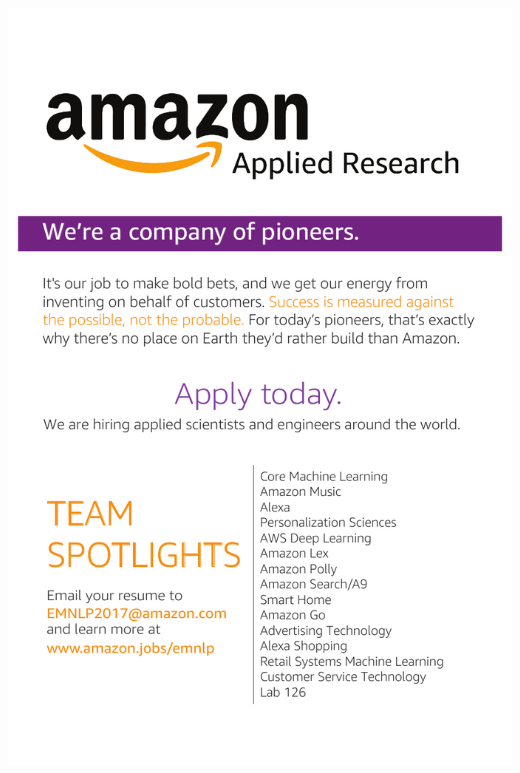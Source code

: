 \thispagestyle{empty}
\begin{center}
  \vfill
  \includegraphics[width=\textwidth]{content/ads/platinum/amazon.pdf}
  \vfill
\end{center}
\clearpage


